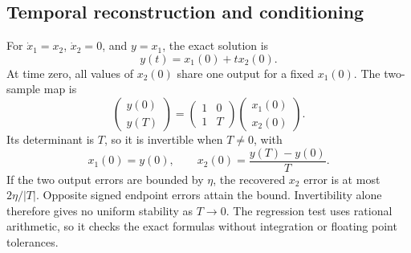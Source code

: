 \subsection{Temporal reconstruction and conditioning}
For \(\dot x_1=x_2\), \(\dot x_2=0\), and \(y=x_1\), the exact solution is
\[
y(t)=x_1(0)+t x_2(0).
\]
At time zero, all values of \(x_2(0)\) share one output for a fixed \(x_1(0)\). The two-sample map is
\[
\begin{pmatrix}y(0)\\y(T)\end{pmatrix}
=\begin{pmatrix}1&0\\1&T\end{pmatrix}
\begin{pmatrix}x_1(0)\\x_2(0)\end{pmatrix}.
\]
Its determinant is \(T\), so it is invertible when \(T\neq0\), with
\[
x_1(0)=y(0),\qquad x_2(0)=\frac{y(T)-y(0)}{T}.
\]
If the two output errors are bounded by \(\eta\), the recovered \(x_2\) error is at most \(2\eta/|T|\). Opposite signed endpoint errors attain the bound. Invertibility alone therefore gives no uniform stability as \(T\to0\). The regression test uses rational arithmetic, so it checks the exact formulas without integration or floating point tolerances.
